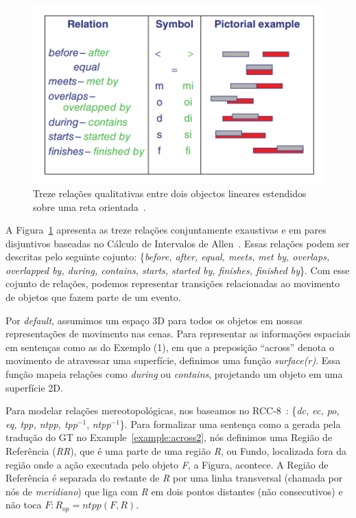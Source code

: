 \documentclass[a4paper, twocolumn, 11pt, twoside]{article}
\begin{document}
\begin{figure}[ht]
	\centering
	\includegraphics[width=\columnwidth]{Figures/13_concep_neigb_relat.png}
	\caption{Treze relações qualitativas entre dois objectos lineares estendidos sobre uma reta orientada~\citep{freksa2016neighborhood}.}
	\label{fig:13_relations}
\end{figure}

A Figura~\ref{fig:13_relations} apresenta  as treze relações conjuntamente exaustivas e em pares disjuntivos baseadas no Cálculo de Intervalos de Allen~\citep{allen1983maintaining}.
Essas relações podem ser descritas pelo seguinte cojunto: \{\textit{before, after, equal, meets, met by, overlaps, overlapped by, during, contains, starts, started by, finishes, finished by}\}. 
Com esse cojunto de relações, podemos representar transições relacionadas ao movimento de objetos que fazem parte de um evento.

Por \textit{default}, assumimos um espaço 3D para todos os objetos em nossas representações de movimento nas cenas. Para representar as informações espaciais em sentenças como as do Exemplo (1), em que a preposição ``across'' denota
o movimento de atravessar uma superfície, definimos uma função \textit{surface(r)}. Essa função mapeia relações como
\textit{during} ou \textit{contains}, projetando um objeto em uma superfície 2D.

Para modelar relações mereotopológicas, nos baseamos no RCC-8~\citep{randell1992spatial}: \{\textit{dc, ec, po, eq, tpp, ntpp, tpp}${^{-1}}$, \textit{ntpp}${^{-1}}$\}.
Para formalizar uma sentença como a gerada pela tradução do GT no Example~\ref{example:across2}, nós definimos uma Região de Referência (\textit{RR}), que é uma parte de 
uma região \textit{R}, ou Fundo, localizada fora da região onde a ação executada pelo objeto \textit{F}, a Figura, 
acontece. A Região de Referência é separada do restante de \textit{R} por uma linha transversal (chamada por nós de \textit{meridiano}) 
que liga com \textit{R} em dois pontos distantes (não consecutivos) e não toca $F: R_{op} = ntpp(F, R)$.
\end{document}
